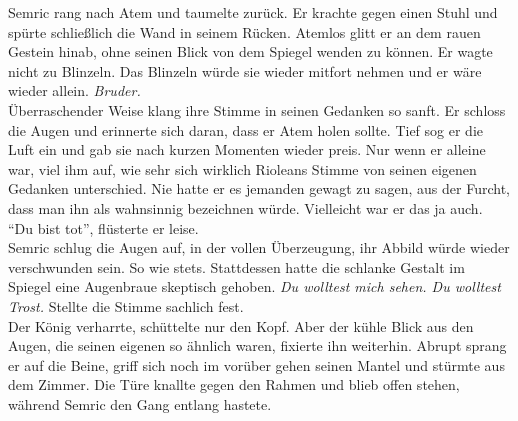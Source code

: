 Semric rang nach Atem und taumelte zurück. Er krachte gegen einen Stuhl und spürte schließlich die 
Wand in seinem Rücken. Atemlos glitt er an dem rauen Gestein hinab, ohne seinen Blick von dem 
Spiegel wenden zu können. Er wagte nicht zu Blinzeln. Das Blinzeln würde sie wieder mitfort nehmen 
und er wäre wieder allein. \textit{Bruder.}\\
Überraschender Weise klang ihre Stimme in seinen Gedanken so sanft. Er schloss die Augen und 
erinnerte sich daran, dass er Atem holen sollte. Tief sog er die Luft ein und gab sie nach kurzen 
Momenten wieder preis. Nur wenn er alleine war, viel ihm auf, wie sehr sich wirklich Rioleans 
Stimme von seinen eigenen Gedanken unterschied. Nie hatte er es jemanden gewagt zu sagen, aus der 
Furcht, dass man ihn als wahnsinnig bezeichnen würde. Vielleicht war er das ja auch.\\
``Du bist tot'', flüsterte er leise.\\
Semric schlug die Augen auf, in der vollen Überzeugung, ihr Abbild würde wieder verschwunden sein. 
So wie stets. Stattdessen hatte die schlanke Gestalt im Spiegel eine Augenbraue skeptisch gehoben. 
\textit{Du wolltest mich sehen. Du wolltest Trost.} Stellte die Stimme sachlich fest. \\
Der König verharrte, schüttelte nur den Kopf. Aber der kühle Blick aus den Augen, die seinen 
eigenen so ähnlich waren, fixierte ihn weiterhin. Abrupt sprang er auf die Beine, griff sich noch 
im vorüber gehen seinen Mantel und stürmte aus dem Zimmer. Die Türe knallte gegen den Rahmen und 
blieb offen stehen, während Semric den Gang entlang hastete.\\

